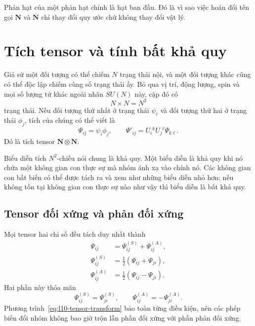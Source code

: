 Phản hạt của một phản hạt chính là hạt ban đầu. Đó là vì sao việc hoán đổi tên gọi \(\mathbf N\) và \(\overline{\mathbf N}\) chỉ thay đổi quy ước chứ không thay đổi vật lý.

\section{Tích tensor và tính bất khả quy}

Giả sử một đối tượng có thể chiếm \(N\) trạng thái nội, và một đối tượng khác cũng có thể độc lập chiếm cùng số trạng thái ấy. Bỏ qua vị trí, động lượng, spin và mọi số lượng tử khác ngoài nhãn \(SU(N)\) này, cặp đó có
\begin{equation}
N\times N=N^2
\label{eq:l10-product-count}
\end{equation}
trạng thái. Nếu đối tượng thứ nhất ở trạng thái \(\psi_i\) và đối tượng thứ hai ở trạng thái \(\phi_j\), tích của chúng có thể viết là
\begin{equation}
\Psi_{ij}=\psi_i\phi_j,
\qquad
\Psi'_{ij}=U_i{}^kU_j{}^\ell\Psi_{k\ell}.
\label{eq:l10-tensor-transform}
\end{equation}
Đó là tích tensor \(\mathbf N\otimes\mathbf N\).

\begin{classroomqa}
\end{classroomqa}

Biểu diễn tích \(N^2\)-chiều nói chung là khả quy. Một biểu diễn là khả quy khi nó chứa một không gian con thực sự mà nhóm ánh xạ vào chính nó. Các không gian con bất biến có thể được tách ra và xem như những biểu diễn nhỏ hơn; nếu không tồn tại không gian con thực sự nào như vậy thì biểu diễn là bất khả quy.

\subsection{Tensor đối xứng và phản đối xứng}

Mọi tensor hai chỉ số đều tách duy nhất thành
\begin{align}
\Psi_{ij}
&=\Psi^{(S)}_{ij}+\Psi^{(A)}_{ij},\\
\Psi^{(S)}_{ij}
&=\frac12(\Psi_{ij}+\Psi_{ji}),\\
\Psi^{(A)}_{ij}
&=\frac12(\Psi_{ij}-\Psi_{ji}).
\label{eq:l10-sym-anti}
\end{align}
Hai phần này thỏa mãn
\begin{equation}
\Psi^{(S)}_{ij}=\Psi^{(S)}_{ji},
\qquad
\Psi^{(A)}_{ij}=-\Psi^{(A)}_{ji}.
\end{equation}
Phương trình~\eqref{eq:l10-tensor-transform} bảo toàn từng điều kiện, nên các phép biến đổi nhóm không bao giờ trộn lẫn phần đối xứng với phần phản đối xứng.

